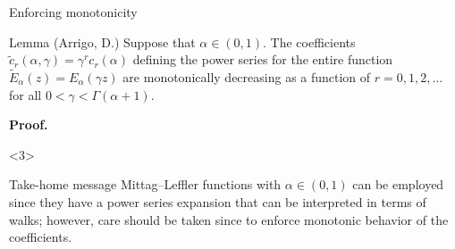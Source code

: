 \documentclass[aspectratio=169,xcolor=dvipsnames]{beamer}
\begin{document}
\begin{frame}{\faHammer\; Enforcing monotonicity}

\begin{alertblock}{Lemma (Arrigo, D.)}
Suppose that $\alpha \in (0,1)$. The coefficients $\widetilde{c}_r(\alpha,\gamma) = \gamma^r c_r(\alpha)$ defining the power series for the entire function $\widetilde{E}_\alpha(z) = E_{\alpha}(\gamma z)$ are monotonically decreasing as a function of $r = 0,1,2,\ldots$ for all $0<\gamma<\Gamma(\alpha+1)$.
\end{alertblock}

\textbf{Proof.}  
\begin{onlyenv}<3>\vspace{-0.5em}
\begin{exampleblock}{\faLuggageCart\;Take-home message}
\small Mittag--Leffler functions with $\alpha\in (0,1)$ can be employed since they have a power series expansion that can be interpreted in terms of walks; however, care should be taken since to enforce monotonic behavior of the coefficients.
\end{exampleblock}
\end{onlyenv}
\end{frame}
\end{document}
